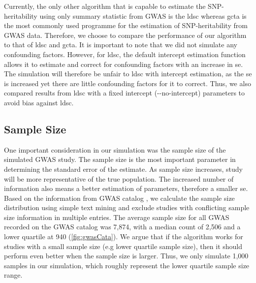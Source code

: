 \documentclass[12pt]{scrbook}
\begin{document}
Currently, the only other algorithm that is capable to estimate the \gls{SNP}-heritability using only summary statistic from \gls{GWAS} is the \gls{ldsc} \citep{Bulik-Sullivan2015} whereas \gls{gcta} \citep{Yang2011} is the most commonly used programme for the estimation of \gls{SNP}-heritability from \gls{GWAS} data. 
Therefore, we choose to compare the performance of our algorithm to that of \gls{ldsc} and \gls{gcta}.
It is important to note that we did not simulate any confounding factors.
However, for \gls{ldsc}, the default intercept estimation function allows it to estimate and correct for confounding factors with an increase in \gls{se}. 
The simulation will therefore be unfair to \gls{ldsc} with intercept estimation, as the \gls{se} is increased yet there are little confounding factors for it to correct.
Thus, we also compared results from \gls{ldsc} with a fixed intercept (-{}-no-intercept) parameters to avoid bias against \gls{ldsc}.	

\subsection{Sample Size}
One important consideration in our simulation was the sample size of the simulated \gls{GWAS} study. 
The sample size is the most important parameter in determining the standard error of the estimate. 
As sample size increases, study will be more representative of the true population. 
The increased number of information also means a better estimation of parameters, therefore a smaller \acrfull{se}.
Based on the information from \gls{GWAS} catalog \citep{Welter2014}, we calculate the sample size distribution using simple text mining and exclude studies with conflicting sample size information in multiple entries. 
The average sample size for all \gls{GWAS} recorded on the \gls{GWAS} catalog was 7,874, with a median count of 2,506 and a lower quartile at 940 (\cref{fig:gwasCata}). 
We argue that if the algorithm works for studies with a small sample size (e.g lower quartile sample size), then it should perform even better when the sample size is larger. 
Thus, we only simulate 1,000 samples in our simulation, which roughly represent the lower quartile sample size range.
\end{document}
